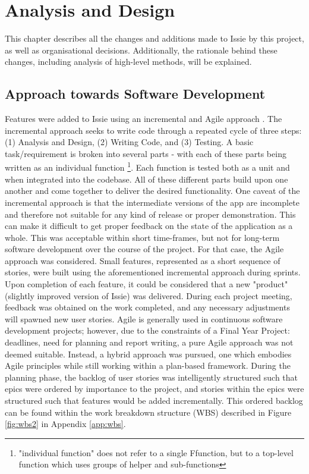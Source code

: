 \chapter{Analysis and Design}
This chapter describes all the changes and additions made to Issie by this project, as well as organisational decisions. Additionally, the rationale behind these changes, including analysis of high-level methods, will be explained. 
\section{Approach towards Software Development}
Features were added to Issie using an incremental and Agile approach \cite{Voorhees2020}.
The incremental approach seeks to write code through a repeated cycle of three steps: (1) Analysis and Design, (2) Writing Code, and (3) Testing. A basic task/requirement is  broken into several parts - with each of these parts being written as an individual function \footnote{"individual function" does not refer to a single F\fsharp function, but to a top-level function which uses groups of helper and sub-functions}. Each function is tested both as a unit and when integrated into the codebase. All of these different parts build upon one another and come together to deliver the desired functionality. One caveat of the incremental approach is that the intermediate versions of the app are incomplete and therefore not suitable for any kind of release or proper demonstration. This can make it difficult to get proper feedback on the state of the application as a whole. This was acceptable within short time-frames, but not for long-term software development over the course of the project. For that case, the Agile approach was considered. Small features, represented as a short sequence of stories, were built using the aforementioned incremental approach during sprints. Upon completion of each feature, it could be considered that a new "product" (slightly improved version of Issie) was delivered. During each project meeting, feedback was obtained on the work completed, and any necessary adjustments will spawned new user stories. Agile is generally used in continuous software development projects; however, due to the constraints of a Final Year Project: deadlines, need for planning and report writing, a pure Agile approach was not deemed suitable. Instead, a hybrid approach was pursued, one which embodies Agile principles while still working within a plan-based framework. During the planning phase, the backlog of user stories was intelligently structured such that epics were ordered by importance to the project, and stories within the epics were structured such that features would be added incrementally. This ordered backlog can be found within the work breakdown structure (WBS) described in Figure \ref{fig:wbs2} in Appendix \ref{app:wbs}.
